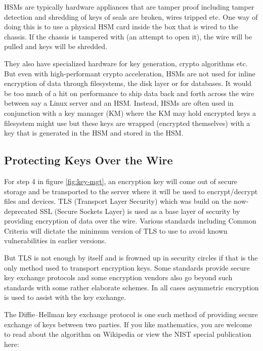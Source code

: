 HSMs are typically hardware appliances that are tamper proof including tamper detection and shredding of keys of seals are broken, wires tripped etc. One way of doing this is to use a physical HSM card inside the box that is wired to the chassis. If the chassis is tampered with (an attempt to open it), the wire will be pulled and keys will be shredded. 

They also have specialized hardware for key generation, crypto algorithms etc. But even with high-performant crypto acceleration, HSMs are not used for inline encryption of data through filesystems, the disk layer or for databases. It would be too much of a hit on performance to ship data back and forth across the wire between say a Linux server and an HSM. Instead, HSMs are often used in conjunction with a key manager (KM) where the KM may hold encrypted keys a filesystem might use but these keys are wrapped (encrypted themselves) with a key that is generated in the HSM and stored in the HSM.

\subsection{Protecting Keys Over the Wire}

For step 4 in figure \ref{fig:key-mgt}, an encryption key will come out of secure storage and be transported to the server where it will be used to encrypt/decrypt files and devices. TLS (Transport Layer Security) which was build on the now-deprecated SSL (Secure Sockets Layer) is used as a base layer of security by providing encryption of data over the wire. Various standards including Common Criteria will dictate the minimum version of TLS to use to avoid known vulnerabilities in earlier versions. 

But TLS is not enough by itself and is frowned up in security circles if that is the only method used to transport encryption keys. Some standards provide secure key exchange protocols and some encryption vendors also go beyond such standards with some rather elaborate schemes. In all cases asymmetric encryption is used to assist with the key exchange. 

The Diffie–Hellman key exchange protocol is one such method of providing secure exchange of keys between two parties. If you like mathematics, you are welcome to read about the algorithm on Wikipedia or view the NIST special publication here:

